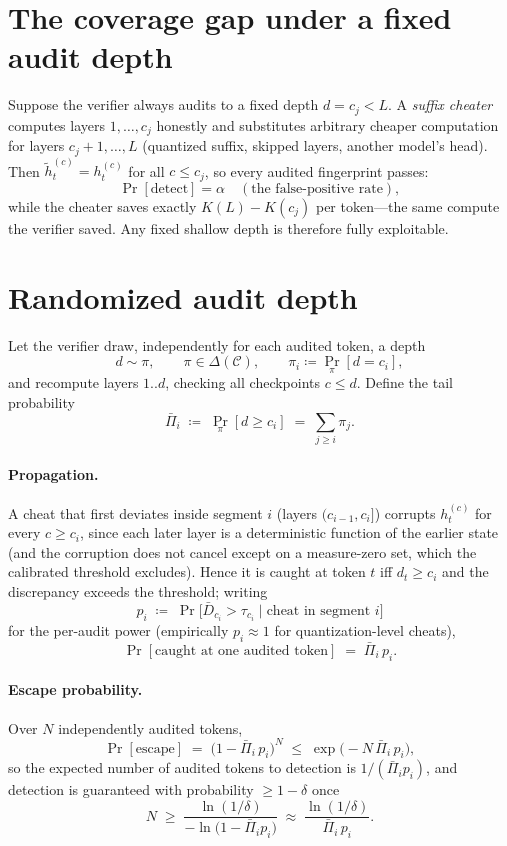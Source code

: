 \documentclass[11pt]{article}
\begin{document}
\section{The coverage gap under a fixed audit depth}

Suppose the verifier always audits to a fixed depth $d = c_j < L$. A \emph{suffix cheater}
computes layers $1,\dots,c_j$ honestly and substitutes arbitrary cheaper computation for
layers $c_j{+}1,\dots,L$ (quantized suffix, skipped layers, another model's head).
Then $\tilde h^{(c)}_t = h^{(c)}_t$ for all $c\le c_j$, so every audited fingerprint passes:
\[
  \Pr[\text{detect}] = \alpha \quad(\text{the false-positive rate}),
\]
while the cheater saves exactly $K(L)-K(c_j)$ per token---the same compute the verifier
saved. Any fixed shallow depth is therefore fully exploitable.

\section{Randomized audit depth}

Let the verifier draw, independently for each audited token, a depth
\[
  d \sim \pi, \qquad \pi \in \Delta(\mathcal{C}),\qquad
  \pi_i \coloneqq \Pr_\pi[d = c_i],
\]
and recompute layers $1..d$, checking all checkpoints $c\le d$. Define the tail probability
\[
  \bar\Pi_i \;\coloneqq\; \Pr_\pi[d \ge c_i] \;=\; \sum_{j\ge i}\pi_j .
\]

\paragraph{Propagation.}
A cheat that first deviates inside segment $i$ (layers $(c_{i-1},c_i]$) corrupts
$h^{(c)}_t$ for every $c \ge c_i$, since each later layer is a deterministic function of the
earlier state (and the corruption does not cancel except on a measure-zero set, which the
calibrated threshold excludes). Hence it is caught at token $t$ iff $d_t \ge c_i$ and the
discrepancy exceeds the threshold; writing
\[
  p_i \;\coloneqq\; \Pr\bigl[\bar D_{c_i}>\tau_{c_i}\;\big|\;\text{cheat in segment } i\bigr]
\]
for the per-audit power (empirically $p_i\approx 1$ for quantization-level cheats),
\[
  \Pr[\text{caught at one audited token}] \;=\; \bar\Pi_i\, p_i .
\]

\paragraph{Escape probability.}
Over $N$ independently audited tokens,
\[
  \Pr[\text{escape}] \;=\; \bigl(1-\bar\Pi_i\,p_i\bigr)^{N}
  \;\le\; \exp\!\bigl(-N\,\bar\Pi_i\,p_i\bigr),
\]
so the expected number of audited tokens to detection is $1/(\bar\Pi_i p_i)$, and
detection is guaranteed with probability $\ge 1-\delta$ once
\[
  N \;\ge\; \frac{\ln(1/\delta)}{-\ln\!\bigl(1-\bar\Pi_i p_i\bigr)}
  \;\approx\; \frac{\ln(1/\delta)}{\bar\Pi_i\,p_i}.
\]
\end{document}
